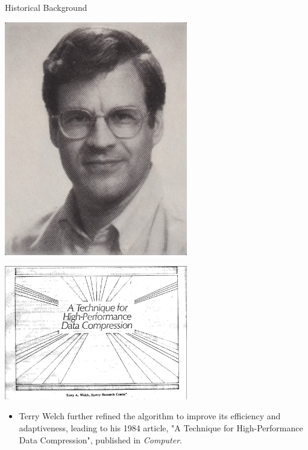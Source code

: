 \documentclass[10pt,handout,english]{beamer}
\begin{document}
\begin{frame}{Historical Background}
    \begin{minipage}{0.49\textwidth}
        \centering
        \includegraphics[width=0.6\textwidth, height=0.7\textwidth]{pic/welch.jpg}
    \end{minipage}%
    \hfill
    \begin{minipage}{0.49\textwidth}
        \centering
        \includegraphics[width=0.6\textwidth, height=0.7\textwidth]{pic/paper1984.png}
    \end{minipage}
 
    \begin{itemize} [label=\textcolor{purple}{$\bullet$}]
        \item  Terry Welch further refined the algorithm to improve its efficiency and adaptiveness, leading to his 1984 article, "A Technique for High-Performance Data Compression", published in \textit{Computer}.
    \end{itemize}
\end{frame}
\end{document}
